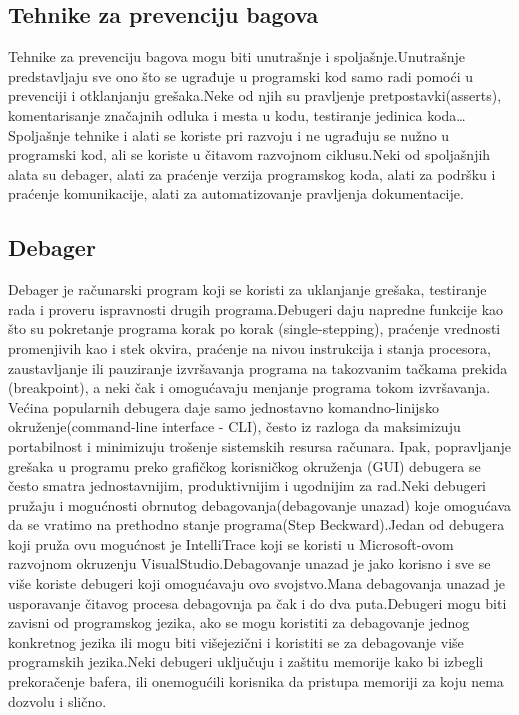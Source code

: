 \documentclass[a4paper]{article}
\begin{document}
\subsection{Tehnike za prevenciju bagova}
\label{subsec:Tehnike za prevenciju bagova}

Tehnike za prevenciju bagova mogu biti unutrašnje i spoljašnje.Unutrašnje predstavljaju sve ono što se ugrađuje u programski kod samo radi pomoći u prevenciji i otklanjanju grešaka.Neke od njih su pravljenje pretpostavki(asserts), komentarisanje značajnih odluka i mesta u kodu, testiranje jedinica koda…Spoljašnje tehnike i alati se koriste pri razvoju i ne ugrađuju se nužno u programski kod, ali se koriste u čitavom razvojnom ciklusu.Neki od spoljašnjih alata su debager, alati za praćenje verzija programskog koda, alati za podršku i praćenje komunikacije, alati za automatizovanje pravljenja dokumentacije\cite{bagovi_smalkov}.

\subsection{Debager}
\label{subsec:Debager}

Debager je računarski program koji se koristi za uklanjanje grešaka, testiranje rada i proveru ispravnosti drugih programa.Debugeri daju napredne funkcije kao što su pokretanje programa korak po korak (single-stepping), praćenje vrednosti promenjivih kao i stek okvira, praćenje na nivou instrukcija i stanja procesora, zaustavljanje ili pauziranje izvršavanja programa na takozvanim tačkama prekida (breakpoint), a neki čak i omogućavaju menjanje programa tokom izvršavanja.\\
\indent Većina popularnih debugera daje samo jednostavno komandno-linijsko okruženje(command-line interface - CLI), često iz razloga da maksimizuju portabilnost i minimizuju trošenje sistemskih resursa računara. Ipak, popravljanje grešaka u programu preko grafičkog korisničkog okruženja (GUI) debugera se često smatra jednostavnijim, produktivnijim i ugodnijim za rad.Neki debugeri pružaju i mogućnosti obrnutog debagovanja(debagovanje unazad) koje omogućava da se vratimo na prethodno stanje programa(Step Beckward).Jedan od debugera koji pruža ovu mogućnost je IntelliTrace koji se koristi u Microsoft-ovom razvojnom okruzenju VisualStudio.Debagovanje unazad je jako korisno i sve se više koriste debugeri koji omogućavaju ovo svojstvo.Mana debagovanja unazad je usporavanje čitavog procesa debagovnja pa čak i do dva puta.Debugeri mogu biti zavisni od programskog jezika, ako se mogu koristiti za debagovanje jednog konkretnog jezika ili mogu biti višejezični i koristiti se za debagovanje više programskih jezika.Neki debugeri uključuju i zaštitu memorije kako bi izbegli prekoračenje bafera, ili onemogućili korisnika da pristupa memoriji za koju nema dozvolu i slično.\cite{ssq_debug_def}
\end{document}
